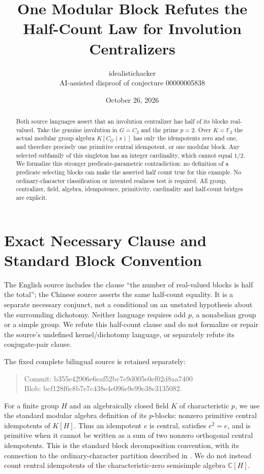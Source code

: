 \documentclass[11pt]{article}
\title{One Modular Block Refutes the Half-Count Law\newline
  for Involution Centralizers}
\author{idealistichacker\\\small AI-assisted disproof of conjecture 00000005838}
\date{October 26, 2026}
\newcommand{\F}{\mathbb F}
\begin{document}
\maketitle
\begin{abstract}
Both source languages assert that an involution centralizer has half of its
blocks real-valued. Take the genuine involution in $G=C_2$ and the prime
$p=2$. Over $K=\overline{\F_2}$ the actual modular group algebra
$K[C_G(s)]$ has only the idempotents zero and one, and therefore precisely
one primitive central idempotent, or one modular block. Any selected
subfamily of this singleton has an integer cardinality, which cannot equal
$1/2$. We formalize this stronger predicate-parametric contradiction:
no definition of a predicate selecting blocks can make the asserted half
count true for this example. No ordinary-character classification or
invented realness test is required. All group, centralizer, field, algebra,
idempotence, primitivity, cardinality and half-count bridges are explicit.
\end{abstract}

\section{Exact Necessary Clause and Standard Block Convention}
The English source includes the clause ``the number of real-valued blocks
is half the total''; the Chinese source asserts the same half-count
equality. It is a separate necessary conjunct, not a conditional on an
unstated hypothesis about the surrounding dichotomy. Neither language
requires odd $p$, a nonabelian group or a simple group. We refute this
half-count clause and do not formalize or repair the source's undefined
kernel/dichotomy language, or separately refute its conjugate-pair clause.

The fixed complete bilingual source is retained separately:
\begin{quote}\small\ttfamily
Commit: b355e42906e6eaf52bc7e9d005e0ef02d8aa7400\\
Blob: bcf128f6c8b7e7c438e4e096e9e99e38c3135082.
\end{quote}
For a finite group $H$ and an algebraically closed field $K$ of
characteristic $p$, we use the standard modular algebra definition of its
$p$-blocks: nonzero primitive central idempotents of $K[H]$. Thus an
idempotent $e$ is central, satisfies $e^2=e$, and is primitive when it
cannot be written as a sum of two nonzero orthogonal central idempotents.
This is the standard block decomposition convention, with its connection
to the ordinary-character partition described in \cite[Chapter~12,
Sections~12.1--12.2]{Webb}. We do not instead count central idempotents of
the characteristic-zero semisimple algebra $\mathbb C[H]$.
\end{document}
